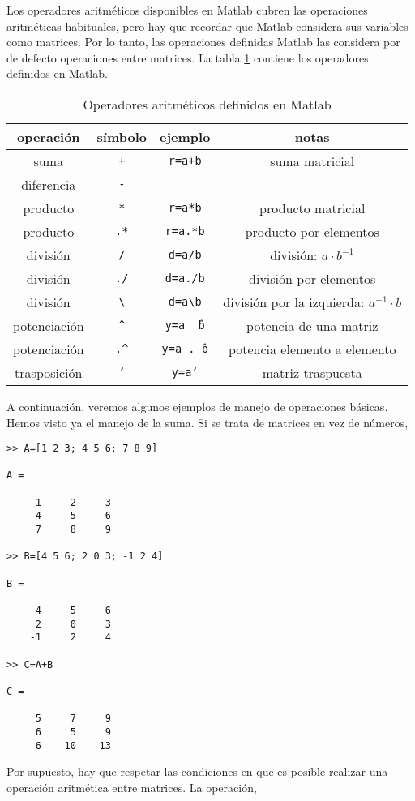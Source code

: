 Los operadores aritméticos disponibles en Matlab cubren las operaciones aritméticas habituales, pero hay que recordar que Matlab considera sus variables como matrices. Por lo tanto, las operaciones definidas Matlab las considera por de defecto operaciones entre matrices. La tabla \ref{tabop} contiene los operadores definidos en  Matlab.

\begin{table}[h]
\caption{Operadores aritméticos definidos en Matlab}
\label{tabop}
\centering
\begin{tabular}{cccc}
operación&símbolo&ejemplo&notas\\
\hline
suma&\texttt{+}&\texttt{r=a+b}&suma matricial\\
\hline
diferencia&\texttt{-}\\
\hline
producto&\texttt{*}&\texttt{r=a*b}&producto matricial\\
producto&\texttt{.*}&\texttt{r=a.*b}&producto por elementos\\
\hline
división&\texttt{/}&\texttt{d=a/b}& división: $a\cdot b^{-1}$\\
división& \texttt{./}& \texttt{d=a./b}& división por elementos\\
división& \texttt{\textbackslash}& \texttt{d=a\textbackslash b}& división por la izquierda: $a^{-1}\cdot b$\\
\hline
potenciación&\texttt{\^}&\texttt{y=a \^\ b}&potencia de una matriz \\
potenciación&\texttt{.\^}&\texttt{y=a .\^\ b}&potencia elemento a elemento\\
\hline
trasposición&\texttt{'}&\texttt{y=a'}&matriz traspuesta\\
\hline
\hline
\end{tabular}
\end{table}

A continuación, veremos algunos ejemplos de manejo de operaciones básicas. Hemos visto ya el manejo de la suma. Si se trata de matrices en vez de números,

\begin{verbatim}
>> A=[1 2 3; 4 5 6; 7 8 9]

A =

     1     2     3
     4     5     6
     7     8     9

>> B=[4 5 6; 2 0 3; -1 2 4]

B =

     4     5     6
     2     0     3
    -1     2     4

>> C=A+B

C =

     5     7     9
     6     5     9
     6    10    13
\end{verbatim}
 Por supuesto, hay que respetar las condiciones en que es posible realizar una operación aritmética entre matrices. La operación,
 
